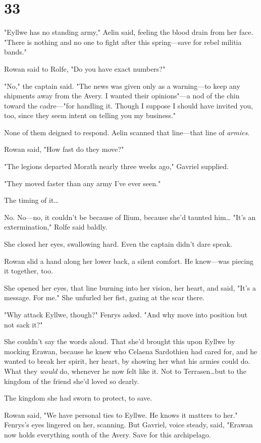 
\chapter{33}

"Eyllwe has no standing army," Aelin said, feeling the blood drain from her face.
"There is nothing and no one to fight after this spring---save for rebel militia bands."

Rowan said to Rolfe, "Do you have exact numbers?"

"No," the captain said.
"The news was given only as a warning---to keep any shipments away from the Avery.
I wanted their opinions"---a nod of the chin toward the cadre---"for handling it.
Though I suppose I should have invited you, too, since they seem intent on telling you my business."

None of them deigned to respond.
Aelin scanned that line---that line of \emph{armies}.

Rowan said, "How fast do they move?"

"The legions departed Morath nearly three weeks ago," Gavriel supplied.

"They moved faster than any army I've ever seen."

The timing of it\ldots{}

No.
No---no, it couldn't be because of Ilium, because she'd taunted him\ldots{} "It's an extermination," Rolfe said baldly.

She closed her eyes, swallowing hard.
Even the captain didn't dare speak.

Rowan slid a hand along her lower back, a silent comfort.
He knew---was piecing it together, too.

She opened her eyes, that line burning into her vision, her heart, and said, "It's a message.
For me."
She unfurled her fist, gazing at the scar there.

"Why attack Eyllwe, though?"
Fenrys asked.
"And why move into position but not sack it?"

She couldn't say the words aloud.
That she'd brought this upon Eyllwe by mocking Erawan, because he knew who Celaena Sardothien had cared for, and he wanted to break her spirit, her heart, by showing her what his armies could do.
What they \emph{would} do, whenever he now felt like it.
Not to Terrasen\ldots but to the kingdom of the friend she'd loved so dearly.

The kingdom she had sworn to protect, to save.

Rowan said, "We have personal ties to Eyllwe.
He knows it matters to her."
Fenrys's eyes lingered on her, scanning.
But Gavriel, voice steady, said, "Erawan now holds everything south of the Avery.
Save for this archipelago.

